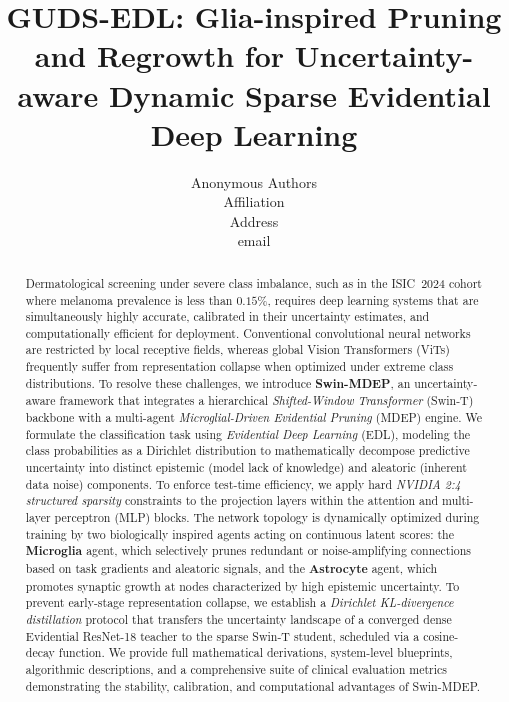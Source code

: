 \documentclass[letterpaper]{article} %
\title{GUDS-EDL: Glia-inspired Pruning and Regrowth for Uncertainty-aware Dynamic Sparse Evidential Deep Learning}
\author{Anonymous Authors\\
Affiliation\\
Address\\
email}
\begin{document}
\maketitle

\begin{abstract}
Dermatological screening under severe class imbalance, such as in the ISIC~2024 cohort where melanoma prevalence is less than $0.15\%$, requires deep learning systems that are simultaneously highly accurate, calibrated in their uncertainty estimates, and computationally efficient for deployment. Conventional convolutional neural networks are restricted by local receptive fields, whereas global Vision Transformers (ViTs) frequently suffer from representation collapse when optimized under extreme class distributions. To resolve these challenges, we introduce \textbf{Swin-MDEP}, an uncertainty-aware framework that integrates a hierarchical \emph{Shifted-Window Transformer} (Swin-T) backbone with a multi-agent \emph{Microglial-Driven Evidential Pruning} (MDEP) engine. We formulate the classification task using \emph{Evidential Deep Learning} (EDL), modeling the class probabilities as a Dirichlet distribution to mathematically decompose predictive uncertainty into distinct epistemic (model lack of knowledge) and aleatoric (inherent data noise) components. To enforce test-time efficiency, we apply hard \emph{NVIDIA 2:4 structured sparsity} constraints to the projection layers within the attention and multi-layer perceptron (MLP) blocks. The network topology is dynamically optimized during training by two biologically inspired agents acting on continuous latent scores: the \textbf{Microglia} agent, which selectively prunes redundant or noise-amplifying connections based on task gradients and aleatoric signals, and the \textbf{Astrocyte} agent, which promotes synaptic growth at nodes characterized by high epistemic uncertainty. To prevent early-stage representation collapse, we establish a \emph{Dirichlet KL-divergence distillation} protocol that transfers the uncertainty landscape of a converged dense Evidential ResNet-18 teacher to the sparse Swin-T student, scheduled via a cosine-decay function. We provide full mathematical derivations, system-level blueprints, algorithmic descriptions, and a comprehensive suite of clinical evaluation metrics demonstrating the stability, calibration, and computational advantages of Swin-MDEP.
\end{abstract}

\end{document}
